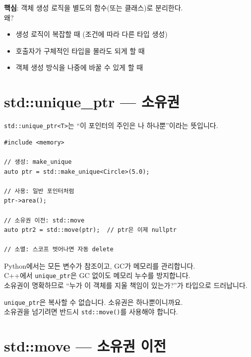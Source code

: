 \documentclass[11pt,a4paper]{book}
\newcommand{\code}[1]{\texttt{#1}}
\begin{document}
\begin{conceptbox}[title={Factory 패턴}]
\textbf{핵심}: 객체 생성 로직을 별도의 함수(또는 클래스)로 분리한다.\\[6pt]
왜?
\begin{itemize}[nosep]
\item 생성 로직이 복잡할 때 (조건에 따라 다른 타입 생성)
\item 호출자가 구체적인 타입을 몰라도 되게 할 때
\item 객체 생성 방식을 나중에 바꿀 수 있게 할 때
\end{itemize}
\end{conceptbox}

\section{std::unique\_ptr — 소유권}

\code{std::unique\_ptr<T>}는 ``이 포인터의 주인은 나 하나뿐''이라는 뜻입니다.

\begin{lstlisting}[style=cpp]
#include <memory>

// 생성: make_unique
auto ptr = std::make_unique<Circle>(5.0);

// 사용: 일반 포인터처럼
ptr->area();

// 소유권 이전: std::move
auto ptr2 = std::move(ptr);  // ptr은 이제 nullptr

// 소멸: 스코프 벗어나면 자동 delete
\end{lstlisting}

\begin{pythonbox}
Python에서는 모든 변수가 참조이고, GC가 메모리를 관리합니다.\\
C++에서 \code{unique\_ptr}은 GC 없이도 메모리 누수를 방지합니다.\\
소유권이 명확하므로 ``누가 이 객체를 지울 책임이 있는가?''가 타입으로 드러납니다.
\end{pythonbox}

\begin{warningbox}
\code{unique\_ptr}은 복사할 수 없습니다. 소유권은 하나뿐이니까요.\\
소유권을 넘기려면 반드시 \code{std::move()}를 사용해야 합니다.
\end{warningbox}

\section{std::move — 소유권 이전}
\end{document}
